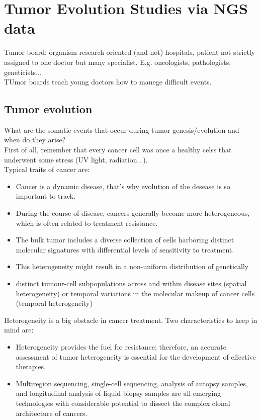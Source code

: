 \graphicspath{{chapters/04/}}

\chapter{Tumor Evolution Studies via NGS data}
Tumor board: organism research oriented (and not) hospitals, patient not strictly assigned to one doctor but many specialist. E.g. oncologists, pathologists, geneticists...
\\
TUmor boards teach young doctors how to manege difficult events.
\section{Tumor evolution}
What are the somatic events that occur during tumor genesis/evolution and when do they arise?\\
First of all, remember that every cancer cell was once a healthy celss that underwent some stress (UV light, radiation...).\\
Typical traits of cancer are:
\begin{itemize}
\item Cancer is a dynamic disease, that's why evolution of the desease is so important to track.
\item During the course of disease, cancers generally become more
heterogeneous, which is often related to treatment resistance.
\item The bulk tumor includes a diverse collection of cells harboring distinct molecular signatures with differential levels of sensitivity to treatment.
\item This heterogeneity might result in a non-uniform distribution of genetically
\item distinct tumour-cell subpopulations across and within disease sites (spatial heterogeneity) or temporal variations in the molecular makeup of cancer cells (temporal heterogeneity)
\end{itemize}

Heterogeneity is a big obstacle in cancer treatment. Two characteristics to keep in mind are:
\begin{itemize}
\item Heterogeneity provides the fuel for resistance; therefore, an accurate assessment of tumor heterogeneity is essential for the development of effective therapies.
\item Multiregion sequencing, single-cell sequencing, analysis of autopsy samples, and longitudinal analysis of liquid biopsy samples are all emerging technologies with considerable potential to dissect the complex clonal architecture of cancers.
\end{itemize}

